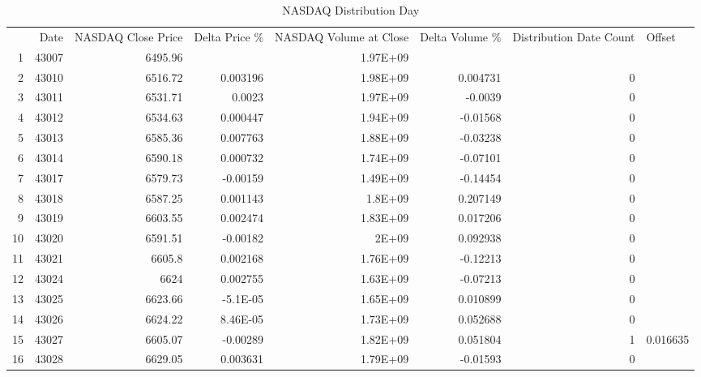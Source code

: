 \documentclass{article}
\begin{document}
\begin{table}[htbp]
  \caption{NASDAQ Distribution Day}
    \begin{tabular}{rrrrrlrr}
          & \multicolumn{1}{p{4.215em}}{Date} & \multicolumn{1}{p{4.215em}}{NASDAQ Close Price} & \multicolumn{1}{p{4.215em}}{Delta Price \%} & \multicolumn{1}{p{4.215em}}{NASDAQ  Volume at Close} & \multicolumn{1}{p{4.215em}}{Delta Volume \%} & \multicolumn{1}{p{4.215em}}{Distribution Date Count} & \multicolumn{1}{l}{Offset} \\
    1     & 43007 & 6495.96 &       & 1.97E+09 &       &       &  \\
    2     & 43010 & 6516.72 & 0.003196 & 1.98E+09 & \multicolumn{1}{r}{0.004731} & 0     &  \\
    3     & 43011 & 6531.71 & 0.0023 & 1.97E+09 & \multicolumn{1}{r}{-0.0039} & 0     &  \\
    4     & 43012 & 6534.63 & 0.000447 & 1.94E+09 & \multicolumn{1}{r}{-0.01568} & 0     &  \\
    5     & 43013 & 6585.36 & 0.007763 & 1.88E+09 & \multicolumn{1}{r}{-0.03238} & 0     &  \\
    6     & 43014 & 6590.18 & 0.000732 & 1.74E+09 & \multicolumn{1}{r}{-0.07101} & 0     &  \\
    7     & 43017 & 6579.73 & -0.00159 & 1.49E+09 & \multicolumn{1}{r}{-0.14454} & 0     &  \\
    8     & 43018 & 6587.25 & 0.001143 & 1.8E+09 & \multicolumn{1}{r}{0.207149} & 0     &  \\
    9     & 43019 & 6603.55 & 0.002474 & 1.83E+09 & \multicolumn{1}{r}{0.017206} & 0     &  \\
    10    & 43020 & 6591.51 & -0.00182 & 2E+09 & \multicolumn{1}{r}{0.092938} & 0     &  \\
    11    & 43021 & 6605.8 & 0.002168 & 1.76E+09 & \multicolumn{1}{r}{-0.12213} & 0     &  \\
    12    & 43024 & 6624  & 0.002755 & 1.63E+09 & \multicolumn{1}{r}{-0.07213} & 0     &  \\
    13    & 43025 & 6623.66 & -5.1E-05 & 1.65E+09 & \multicolumn{1}{r}{0.010899} & 0     &  \\
    14    & 43026 & 6624.22 & 8.46E-05 & 1.73E+09 & \multicolumn{1}{r}{0.052688} & 0     &  \\
    15    & 43027 & 6605.07 & -0.00289 & 1.82E+09 & \multicolumn{1}{r}{0.051804} & 1     & 0.016635 \\
    16    & 43028 & 6629.05 & 0.003631 & 1.79E+09 & \multicolumn{1}{r}{-0.01593} & 0     &  \\

\end{tabular}
\end{table}
\end{document}
